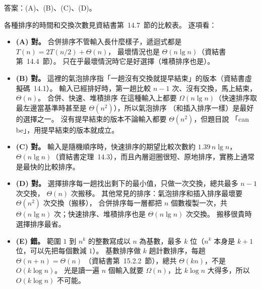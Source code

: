 \begin{pastsoln}
答案：(A)、(B)、(C)、(D)。

各種排序的時間和交換次數見資結書第~14.7~節的比較表。 逐項看：
\begin{itemize}
\item \textbf{(A) 對。} 合併排序不管輸入長什麼樣子，遞迴式都是 $T(n) = 2T(n/2) + \Theta(n)$，
最壞情況也是 $\Theta(n \lg n)$（資結書第~14.4~節）。 只在乎最壞情況時它是好選擇（堆積排序也是）。
\item \textbf{(B) 對。} 這裡的氣泡排序指「一趟沒有交換就提早結束」的版本（資結書虛擬碼~14.1）。
輸入已經排好時，第一趟比較 $n - 1$ 次、沒有交換，馬上結束，$\Theta(n)$。 合併、快速、堆積排序
在這種輸入上都要 $\Omega(n \lg n)$（快速排序取最左邊當基準時甚至是 $\Theta(n^2)$），所以氣泡排序
（和插入排序一樣）是最好的選擇之一。 沒有提早結束的版本不論輸入都要 $\Theta(n^2)$，但題目說
「can be」，用提早結束的版本就成立。
\item \textbf{(C) 對。} 輸入是隨機順序時，快速排序的期望比較次數約 $1.39\, n \lg n$，
$\Theta(n \lg n)$（資結書定理~14.3），而且內層迴圈很短、原地排序，實務上通常是最快的比較排序。
\item \textbf{(D) 對。} 選擇排序每一趟找出剩下的最小值，只做一次交換，總共最多 $n - 1$ 次交換，
$\Theta(n)$ 次搬移。 其他常見的排序：氣泡排序和插入排序最壞要 $\Theta(n^2)$ 次交換（搬移），
合併排序每一層都把 $n$ 個數複製一次，共 $\Theta(n \lg n)$ 次；快速排序、堆積排序也是
$\Theta(n \lg n)$ 次交換。 搬移很貴時選擇排序最省。
\item \textbf{(E) 錯。} 範圍 $1$ 到 $n^k$ 的整數寫成以 $n$ 為基數，最多 $k$ 位（$n^k$ 本身是
$k + 1$ 位，可以先把每個數減 $1$）。 基數排序做 $k$ 趟計數排序，每趟 $\Theta(n + n) = \Theta(n)$
（資結書第~15.2.2~節），總共 $\Theta(kn)$，不是 $O(k \log n)$。 光是讀一遍 $n$ 個輸入就要
$\Omega(n)$，比 $k \log n$ 大得多，所以 $O(k \log n)$ 不可能。
\end{itemize}
\end{pastsoln}
